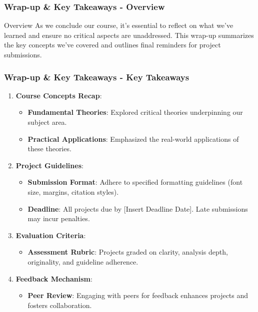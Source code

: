 \documentclass[aspectratio=169]{beamer}
\begin{document}
\begin{frame}[fragile]
    \frametitle{Wrap-up \& Key Takeaways - Overview}
    \begin{block}{Overview}
        As we conclude our course, it's essential to reflect on what we've learned and ensure no critical aspects are unaddressed. This wrap-up summarizes the key concepts we've covered and outlines final reminders for project submissions.
    \end{block}
\end{frame}

\begin{frame}[fragile]
    \frametitle{Wrap-up \& Key Takeaways - Key Takeaways}
    \begin{enumerate}
        \item \textbf{Course Concepts Recap}:
            \begin{itemize}
                \item \textbf{Fundamental Theories}: Explored critical theories underpinning our subject area.
                \item \textbf{Practical Applications}: Emphasized the real-world applications of these theories.
            \end{itemize}
        
        \item \textbf{Project Guidelines}:
            \begin{itemize}
                \item \textbf{Submission Format}: Adhere to specified formatting guidelines (font size, margins, citation styles).
                \item \textbf{Deadline}: All projects due by [Insert Deadline Date]. Late submissions may incur penalties.
            \end{itemize}

        \item \textbf{Evaluation Criteria}:
            \begin{itemize}
                \item \textbf{Assessment Rubric}: Projects graded on clarity, analysis depth, originality, and guideline adherence.
            \end{itemize}
        
        \item \textbf{Feedback Mechanism}:
            \begin{itemize}
                \item \textbf{Peer Review}: Engaging with peers for feedback enhances projects and fosters collaboration.
            \end{itemize}
    \end{enumerate}
\end{frame}
\end{document}

